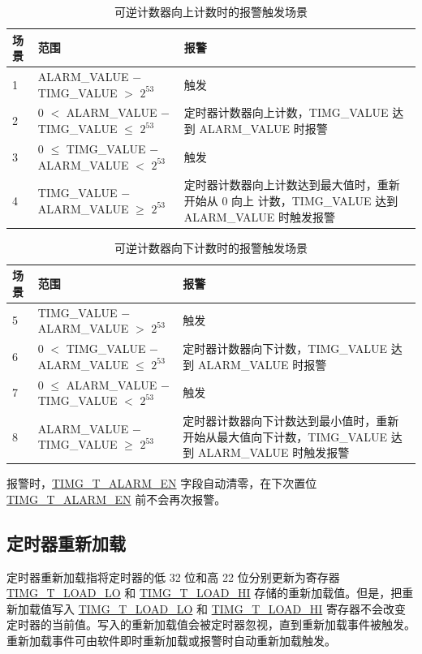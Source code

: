 \documentclass[main\_\_CN.tex]{subfiles}
\begin{document}
\begin{table}[H]
\centering
\caption{可逆计数器向上计数时的报警触发场景}
\label{tab:timg-alarm-generation-up}

\begin{tabular}{|l|l|m{7cm}|}
\hline
\rowcolor{lightgray}
    \textbf{场景} & \textbf{范围} & \textbf{报警} \\\hline
     1 & ALARM\_VALUE $-$ TIMG\_VALUE $>$ $2^{53}$ & 触发 \\\hline
     2 & 0 $<$ ALARM\_VALUE $-$ TIMG\_VALUE $\leq$ $2^{53}$ & 定时器计数器向上计数，TIMG\_VALUE 达到 ALARM\_VALUE 时报警 \\\hline
     3 & 0 $\leq$ TIMG\_VALUE $-$ ALARM\_VALUE $<$ $2^{53}$ & 触发 \\\hline
     4 & TIMG\_VALUE $-$ ALARM\_VALUE $\geq$ $2^{53}$ & 定时器计数器向上计数达到最大值时，重新开始从 0 向上 计数，TIMG\_VALUE 达到 ALARM\_VALUE 时触发报警\\\hline

\end{tabular}
\end{table}

\begin{table}[H]
\centering
\caption{可逆计数器向下计数时的报警触发场景}
\label{tab:timg-alarm-generation-down}

\begin{tabular}{|l|l|m{7cm}|}
\hline
\rowcolor{lightgray}
    \textbf{场景} & \textbf{范围} & \textbf{报警} \\\hline
     5 & TIMG\_VALUE $-$ ALARM\_VALUE  $>$ $2^{53}$ & 触发 \\\hline
     6 &  0 $<$ TIMG\_VALUE $-$ ALARM\_VALUE $\leq$ $2^{53}$ & 定时器计数器向下计数，TIMG\_VALUE 达到 ALARM\_VALUE 时报警 \\\hline
     7 & 0 $\leq$ ALARM\_VALUE $-$ TIMG\_VALUE $<$ $2^{53}$ & 触发 \\\hline
     8 & ALARM\_VALUE $-$ TIMG\_VALUE $\geq$ $2^{53}$ & 定时器计数器向下计数达到最小值时，重新开始从最大值向下计数，TIMG\_VALUE 达到 ALARM\_VALUE 时触发报警 \\\hline

\end{tabular}
\end{table}

报警时，\hyperref[fielddesc:TIMGTXALARMEN]{TIMG\_T\_ALARM\_EN} 字段自动清零，在下次置位 \hyperref[fielddesc:TIMGTXALARMEN]{TIMG\_T\_ALARM\_EN} 前不会再次报警。

\subsection{定时器重新加载} \label{sec:timg-func-descr-reload}
定时器重新加载指将定时器的低 32 位和高 22 位分别更新为寄存器 \hyperref[fielddesc:TIMGTXLOADLO]{TIMG\_T\_LOAD\_LO} 和 \hyperref[fielddesc:TIMGTXLOADHI]{TIMG\_T\_LOAD\_HI} 存储的重新加载值。但是，把重新加载值写入 \hyperref[fielddesc:TIMGTXLOADLO]{TIMG\_T\_LOAD\_LO} 和 \hyperref[fielddesc:TIMGTXLOADHI]{TIMG\_T\_LOAD\_HI} 寄存器不会改变定时器的当前值。写入的重新加载值会被定时器忽视，直到重新加载事件被触发。重新加载事件可由软件即时重新加载或报警时自动重新加载触发。
\end{document}
